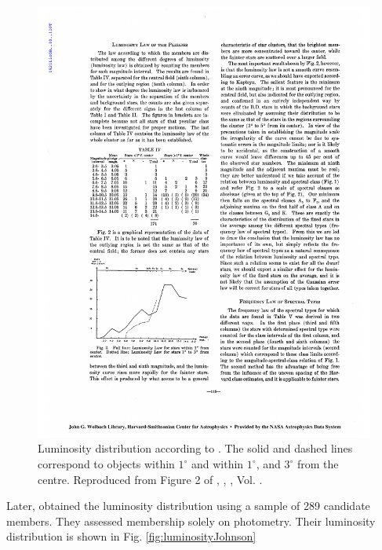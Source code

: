 \begin{figure}[ht!]
\begin{center}
\includegraphics[width=\textwidth]{background/Figures/F2_Trumpler1921.pdf}
\caption{Luminosity distribution according to \citet{Trumpler1921}. The solid and dashed lines correspond to objects within $1^{\circ}$ and within $1^{\circ}$, and $3^{\circ}$ from the centre. Reproduced from Figure 2 of \citet{Trumpler1921}, \textit{}, , Vol. .}
\label{fig:luminosityTrumpler}
\end{center}
\end{figure}

Later, \citet{Johnson1958} obtained the luminosity distribution using a sample of 289 candidate members. They assessed  membership solely on photometry. Their luminosity distribution is shown in Fig. \ref{fig:luminosityJohnson}

